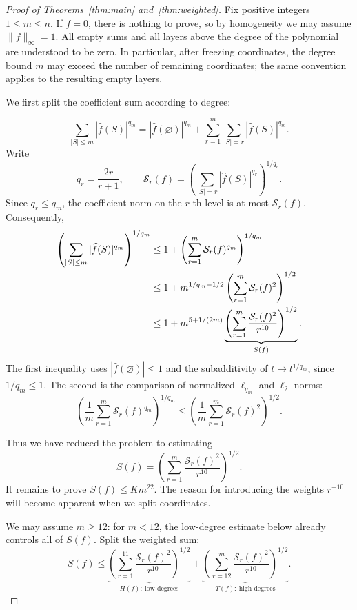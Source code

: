 \documentclass[11pt]{amsart}
\theoremstyle{remark}
\numberwithin{equation}{section}
\begin{document}
\begin{proof}[Proof of Theorems~\ref{thm:main} and~\ref{thm:weighted}]
Fix positive integers $1\le m\le n$. If $f=0$, there is nothing to prove,
so by homogeneity we may assume $\|f\|_\infty=1$.
All empty sums and all layers above the degree of the polynomial are
understood to be zero. In particular, after freezing coordinates, the
degree bound $m$ may exceed the number of remaining coordinates; the same
convention applies to the resulting empty layers.

We first split the coefficient sum according to degree:

\[
\sum_{|S|\le m}|\widehat f(S)|^{q_m}
=|\widehat f(\varnothing)|^{q_m}
+\sum_{r=1}^m\sum_{|S|=r}|\widehat f(S)|^{q_m}.
\]
Write
\[
q_r=\frac{2r}{r+1},\qquad
\mathcal{S}_{r}(f)=\left(\sum_{|S|=r}|\widehat f(S)|^{q_r}\right)^{1/q_r}.
\]
Since $q_r\le q_m$, the coefficient norm on the $r$-th level is at most
$\mathcal{S}_{r}(f)$. Consequently,
\begin{align}
\left(\sum_{|S|\le m}|\widehat f(S)|^{q_m}\right)^{1/q_m}
&\le 1+\left(\sum_{r=1}^m \mathcal{S}_{r}(f)^{q_m}\right)^{1/q_m}\notag\\
&\le 1+m^{1/q_m-1/2}\left(\sum_{r=1}^m \mathcal{S}_{r}(f)^2\right)^{1/2}\notag\\
&\le 1+m^{5+1/(2m)}
\underbrace{\left(\sum_{r=1}^m\frac{\mathcal{S}_{r}(f)^2}{r^{10}}\right)^{1/2}}_{S(f)}.
\label{eq:start}
\end{align}
The first inequality uses $|\widehat f(\varnothing)|\le1$ and the
subadditivity of $t\mapsto t^{1/q_m}$, since $1/q_m\le1$.
The second is the comparison of normalized $\ell_{q_m}$ and $\ell_2$ norms:
\[
\left(\frac1m\sum_{r=1}^m \mathcal{S}_{r}(f)^{q_m}\right)^{1/q_m}
\le\left(\frac1m\sum_{r=1}^m \mathcal{S}_{r}(f)^2\right)^{1/2}.
\]

Thus we have reduced the problem to estimating
\[
S(f)=\left(\sum_{r=1}^m\frac{\mathcal{S}_{r}(f)^2}{r^{10}}\right)^{1/2}.
\]
It remains to prove $S(f)\le K m^{22}$. The reason for introducing the weights
$r^{-10}$ will become apparent when we split coordinates.

We may assume $m\ge12$: for $m<12$, the low-degree estimate below already
controls all of $S(f)$. Split the weighted sum:
\begin{equation}
S(f)\le
\underbrace{\left(\sum_{r=1}^{11}\frac{\mathcal{S}_{r}(f)^2}{r^{10}}\right)^{1/2}}_{H(f):\ \text{low degrees}}
+\underbrace{\left(\sum_{r=12}^{m}\frac{\mathcal{S}_{r}(f)^2}{r^{10}}\right)^{1/2}}_{T(f):\ \text{high degrees}}.
\label{eq:headtail}
\end{equation}


\end{proof}
\end{document}
